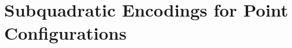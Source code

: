 \chapter{Subquadratic Encodings for Point Configurations}
\label{paper:order-type-encoding}









